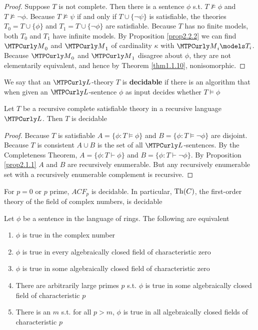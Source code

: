 \documentclass[11pt]{article}
\begin{document}
\begin{proof}
Suppose \(T\) is not complete. Then there is a sentence \(\phi\) s.t. 
\(T\not\models\phi\) and \(T\not\models\neg\phi\). Because
\(T\not\models\psi\) if and only if \(T\cup\{\neg\psi\}\) is satisfiable, the
theories \(T_0=T\cup\{\phi\}\) and \(T_1=T\cup\{\neg\phi\}\) are satisfiable.
Because \(T\) has no finite models, both \(T_0\) and \(T_1\) have infinite
models. By Proposition \ref{prop2.2.2} we can find \(\calm_0\) and
\(\calm_1\) of cardinality \(\kappa\) with \(\calm_i\models T_i\). Because \(\calm_0\)
and \(\calm_1\) disagree about \(\phi\), they are not elementarily equivalent, and
hence by Theorem \ref{thm1.1.10}, nonisomorphic. 
\end{proof}

\begin{definition}[]
We say that an \(\call\)-theory \(T\) is \textbf{decidable} if there is an algorithm
that when given an \(\call\)-sentence \(\phi\) as input decides whether \(T\models\phi\)
\end{definition}

\begin{lemma}[]
Let \(T\) be a recursive complete satisfiable theory in a recursive language
\(\call\). Then \(T\) is decidable
\end{lemma}

\begin{proof}
Because \(T\) is satisfiable \(A=\{\phi:T\models\phi\}\) and
\(B=\{\phi:T\models\neg\phi\}\) are disjoint. Because \(T\) is consistent 
\(A\cup B\) is the set of all \(\call\)-sentences. By the Completeness
Theorem, \(A=\{\phi:T\vdash\phi\}\) and \(B=\{\phi:T\vdash\neg\phi\}\). By
Proposition \ref{prop2.1.1} \(A\) and \(B\) are recursively enumerable. But any
recursively enumerable set with a recursively enumerable complement is
recursive. 
\end{proof}

\begin{corollary}[]
For \(p=0\) or \(p\) prime, \(ACF_p\) is decidable. In particular, \(\operatorname{Th}(\relax{C})\),
the first-order theory  of the field of complex numbers, is decidable
\end{corollary}

\begin{corollary}[]
Let \(\phi\) be a sentence in the language of rings. The following are equivalent
\begin{enumerate}
\item \(\phi\) is true in the complex number
\item \(\phi\) is true in every algebraically closed field of characteristic zero
\item \(\phi\) is true in some algebraically closed field of characteristic zero
\item There are arbitrarily large primes \(p\) s.t. \(\phi\) is true in some
algebraically closed field of characteristic \(p\)
\item There is an \(m\) s.t. for all \(p>m\), \(\phi\) is true in all algebraically
closed fields of characteristic \(p\)
\end{enumerate}
\end{corollary}
\end{document}
